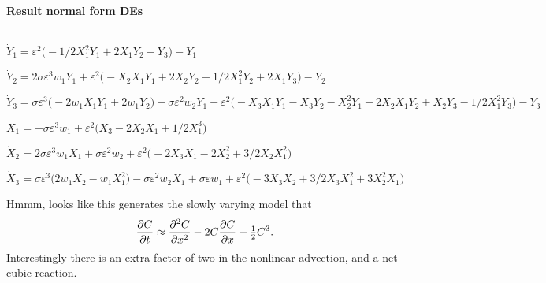 \documentclass[11pt,a5paper]{article}
\begin{document}
\paragraph{Result normal form DEs}
\begin{math}
\end{math}\par

\begin{math}
\dot Y_{1}=\varepsilon ^{2} \big(-1/2 X_{1}^{2} Y_{1}+2 X_{1} Y_{2}-Y_{3
}\big)-Y_{1}
\end{math}\par

\begin{math}
\dot Y_{2}=2 \sigma  \varepsilon ^{3} w_{1} Y_{1}+\varepsilon ^{2} \big(
-X_{2} X_{1} Y_{1}+2 X_{2} Y_{2}-1/2 X_{1}^{2} Y_{2}+2 X_{1} Y_{3}\big)-
Y_{2}
\end{math}\par

\begin{math}
\dot Y_{3}=\sigma  \varepsilon ^{3} \big(-2 w_{1} X_{1} Y_{1}+2 w_{1} Y_
{2}\big)-\sigma  \varepsilon ^{2} w_{2} Y_{1}+\varepsilon ^{2} \big(-X_{
3} X_{1} Y_{1}-X_{3} Y_{2}-X_{2}^{2} Y_{1}-2 X_{2} X_{1} Y_{2}+X_{2} Y_{
3}-1/2 X_{1}^{2} Y_{3}\big)-Y_{3}
\end{math}\par

\begin{math}
\dot X_{1}=-\sigma  \varepsilon ^{3} w_{1}+\varepsilon ^{2} \big(X_{3}-2
 X_{2} X_{1}+1/2 X_{1}^{3}\big)
\end{math}\par

\begin{math}
\dot X_{2}=2 \sigma  \varepsilon ^{3} w_{1} X_{1}+\sigma  \varepsilon ^{
2} w_{2}+\varepsilon ^{2} \big(-2 X_{3} X_{1}-2 X_{2}^{2}+3/2 X_{2} X_{1
}^{2}\big)
\end{math}\par

\begin{math}
\dot X_{3}=\sigma  \varepsilon ^{3} \big(2 w_{1} X_{2}-w_{1} X_{1}^{2}
\big)-\sigma  \varepsilon ^{2} w_{2} X_{1}+\sigma  \varepsilon  w_{1}+
\varepsilon ^{2} \big(-3 X_{3} X_{2}+3/2 X_{3} X_{1}^{2}+3 X_{2}^{2} X_{
1}\big)
\end{math}

Hmmm, looks like this generates the slowly varying model that
\begin{equation*}
\D tC\approx \DD xC-2C\D xC+\rat12C^3.
\end{equation*}
Interestingly there is an extra factor of two in the nonlinear advection, and a net cubic reaction.
\end{document}
